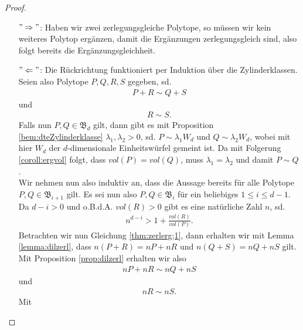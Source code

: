 \documentclass[11pt,titlepage]{article}
\theoremstyle{definition}
\theoremstyle{remark}
\begin{document}
	\begin{proof}
		\noindent
		\begin{itemize}
			\item[$"\Rightarrow"$:] Haben wir zwei zerlegungsgleiche Polytope, so müssen wir kein weiteres Polytop ergänzen, damit die Ergänzungen zerlegungsgleich sind, also folgt bereits die Ergänzungsgleichheit.
			
			\item[$"\Leftarrow"$:] Die Rückrichtung funktioniert per 
			Induktion über die Zylinderklassen. Seien also Polytope 
			$P,Q,R,S$ gegeben, sd. 
			\begin{align}
			P+R\sim Q+S \label{thm:zerlerg;1}
			\end{align}
			und
			\begin{align}
			R\sim S. \label{thm:zerlerg;2}
			\end{align}
			Falls nun $P,Q\in \mathfrak{B}_d$ gilt, dann gibt es mit 
			Proposition \ref{bem:dteZylinderklasse} 
			$\lambda_1,\lambda_2 >0$, sd. $P\sim \lambda_1 W_d$ und 
			$Q\sim \lambda_2 W_d$, wobei mit hier $W_d$ der $d$-dimensionale 
			Einheitswürfel gemeint ist. Da mit Folgerung \ref{coroll:ergvol} 
			folgt, dass $vol(P)=vol(Q)$, muss $\lambda_1 =\lambda_2$ und 
			damit $P\sim Q$. \\
			Wir nehmen nun also induktiv an, dass die Aussage bereits für alle 
			Polytope $P,Q\in\mathfrak{B}_{i+1}$ gilt. Es sei nun also 
			$P,Q\in\mathfrak{B}_i$ für ein beliebiges $1\leq i\leq d-1$. 
			Da $d-i>0$ und o.B.d.A. $vol(R)>0$ gibt es eine natürliche Zahl $n$, sd. 
			\begin{align}
			n^{d-i}>1+\frac{vol(R)}{vol(P)}. \label{thm:zerlerg;3}
			\end{align}
			Betrachten wir nun Gleichung \ref{thm:zerlerg;1}, dann erhalten wir 
			mit Lemma \ref{lemma:dilzerl}, dass $n(P+R)=nP+nR$ und $n(Q+S)=nQ+nS$ 
			gilt. Mit Proposition \ref{prop:dilzerl} erhalten wir also
			\begin{align}
			nP+nR\sim nQ+nS \label{thm:zerlerg;4}
			\end{align}
			und
			\begin{align}
			nR\sim nS. \label{thm:zerlerg;5}
			\end{align}
			Mit 
			
			

\end{itemize}
\end{proof}
\end{document}
